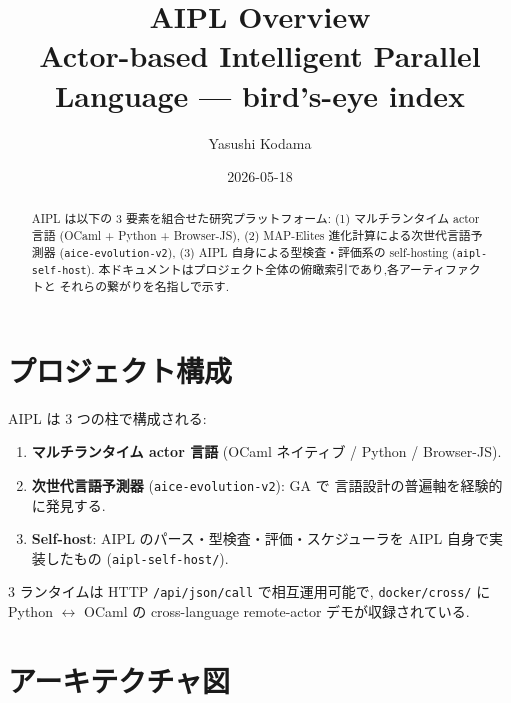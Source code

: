 \documentclass[11pt,a4paper]{article}
\title{\textbf{AIPL Overview}\\
\large Actor-based Intelligent Parallel Language --- bird's-eye index}
\author{Yasushi Kodama}
\date{2026-05-18}
\begin{document}
\maketitle

\begin{abstract}
\noindent AIPL は以下の 3 要素を組合せた研究プラットフォーム:
(1) マルチランタイム actor 言語 (OCaml + Python + Browser-JS),
(2) MAP-Elites 進化計算による次世代言語予測器 (\texttt{aice-evolution-v2}),
(3) AIPL 自身による型検査・評価系の self-hosting (\texttt{aipl-self-host}).
本ドキュメントはプロジェクト全体の俯瞰索引であり,各アーティファクトと
それらの繋がりを名指しで示す.
\end{abstract}

\tableofcontents
\vspace{8pt}

\section{プロジェクト構成}

AIPL は 3 つの柱で構成される:

\begin{enumerate}\setlength{\itemsep}{2pt}
\item \textbf{マルチランタイム actor 言語}
   (OCaml ネイティブ / Python / Browser-JS).
\item \textbf{次世代言語予測器} (\texttt{aice-evolution-v2}): GA で
   言語設計の普遍軸を経験的に発見する.
\item \textbf{Self-host}: AIPL のパース・型検査・評価・スケジューラを
   AIPL 自身で実装したもの (\texttt{aipl-self-host/}).
\end{enumerate}

3 ランタイムは HTTP \texttt{/api/json/call} で相互運用可能で,
\texttt{docker/cross/} に Python $\leftrightarrow$ OCaml の cross-language
remote-actor デモが収録されている.

\section{アーキテクチャ図}
\end{document}
